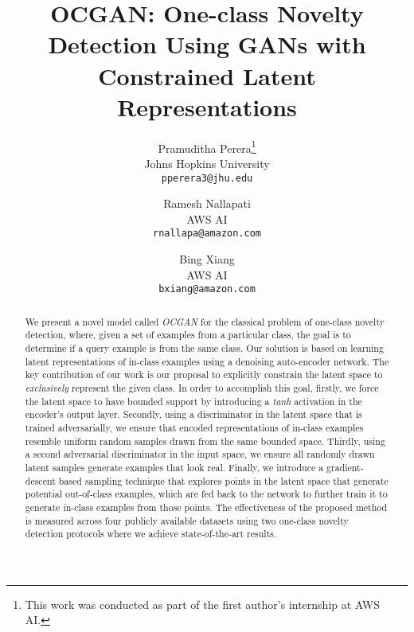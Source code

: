 \documentclass[10pt,twocolumn,letterpaper]{article}
\begin{document}
\title{OCGAN: One-class Novelty Detection Using GANs with Constrained Latent Representations}

\author{Pramuditha Perera\thanks{This work was conducted as part of the first author's internship at AWS AI.}\\
Johns Hopkins University\\
{\tt\small pperera3@jhu.edu}
\and
Ramesh Nallapati\\
AWS AI\\
{\tt\small rnallapa@amazon.com}
\and
Bing Xiang\\
AWS AI\\
{\tt\small bxiang@amazon.com}
}





\maketitle


\begin{abstract}
We present a novel model called {\it OCGAN} for the classical problem of one-class novelty detection, where, given a set of examples from a particular class, the goal is to determine if a query example is from the same class. Our solution is based on learning latent representations of in-class examples using a denoising auto-encoder network. The key contribution of our work is our proposal to explicitly constrain the latent space to {\it exclusively} represent the given class. In order to accomplish this goal, firstly, we force the latent space to have bounded support by introducing a {\it tanh} activation in the encoder's output layer. Secondly, using a discriminator in the latent space that is trained adversarially, we ensure that encoded representations of in-class examples resemble uniform random samples drawn from the same bounded space. Thirdly, using a second adversarial discriminator in the input space, we ensure all randomly drawn latent samples generate examples that look real. Finally, we introduce a gradient-descent based sampling technique that explores points in the latent space that generate potential out-of-class examples, which are fed back to the network to further train it to generate in-class examples from those points. The effectiveness of the proposed method is measured across four publicly available datasets using two one-class novelty detection protocols where we achieve state-of-the-art results. 

\end{abstract}
\end{document}
